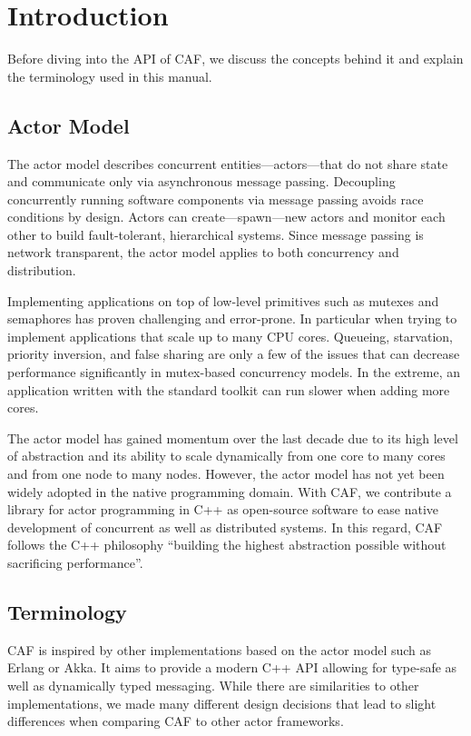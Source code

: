 \section{Introduction}

Before diving into the API of CAF, we discuss the concepts behind it and
explain the terminology used in this manual.

\subsection{Actor Model}

The actor model describes concurrent entities---actors---that do not share
state and communicate only via asynchronous message passing. Decoupling
concurrently running software components via message passing avoids race
conditions by design. Actors can create---spawn---new actors and monitor each
other to build fault-tolerant, hierarchical systems. Since message passing is
network transparent, the actor model applies to both concurrency and
distribution.

Implementing applications on top of low-level primitives such as mutexes and
semaphores has proven challenging and error-prone. In particular when trying to
implement applications that scale up to many CPU cores. Queueing, starvation,
priority inversion, and false sharing are only a few of the issues that can
decrease performance significantly in mutex-based concurrency models. In the
extreme, an application written with the standard toolkit can run slower when
adding more cores.

The actor model has gained momentum over the last decade due to its high level
of abstraction and its ability to scale dynamically from one core to many cores
and from one node to many nodes. However, the actor model has not yet been
widely adopted in the native programming domain. With CAF, we contribute a
library for actor programming in C++ as open-source software to ease native
development of concurrent as well as distributed systems. In this regard, CAF
follows the C++ philosophy ``building the highest abstraction possible without
sacrificing performance''.

\subsection{Terminology}

CAF is inspired by other implementations based on the actor model such as
Erlang or Akka. It aims to provide a modern C++ API allowing for type-safe as
well as dynamically typed messaging. While there are similarities to other
implementations, we made many different design decisions that lead to slight
differences when comparing CAF to other actor frameworks.

